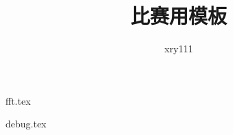 \documentclass{article}
\title{比赛用模板}
\author{xry111}
\begin{document}
\maketitle

\tableofcontents






{fft.tex}




\graphicspath{{./debug/}}
{debug.tex}
\end{document}
